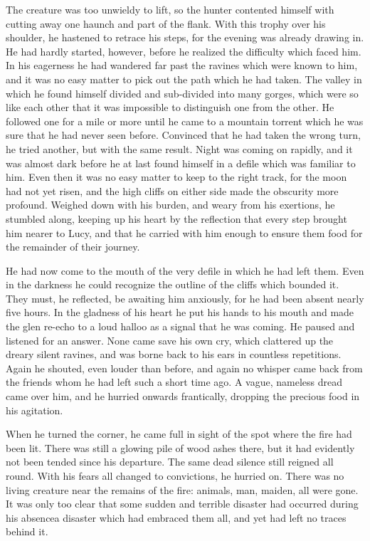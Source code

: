 \documentclass[12pt,english]{book}
\begin{document}
The creature was too unwieldy to lift, so the hunter contented himself
with cutting away one haunch and part of the flank. With this trophy
over his shoulder, he hastened to retrace his steps, for the evening
was already drawing in. He had hardly started, however, before he
realized the difficulty which faced him. In his eagerness he had wandered
far past the ravines which were known to him, and it was no easy matter
to pick out the path which he had taken. The valley in which he found
himself divided and sub-divided into many gorges, which were so like
each other that it was impossible to distinguish one from the other.
He followed one for a mile or more until he came to a mountain torrent
which he was sure that he had never seen before. Convinced that he
had taken the wrong turn, he tried another, but with the same result.
Night was coming on rapidly, and it was almost dark before he at last
found himself in a defile which was familiar to him. Even then it
was no easy matter to keep to the right track, for the moon had not
yet risen, and the high cliffs on either side made the obscurity more
profound. Weighed down with his burden, and weary from his exertions,
he stumbled along, keeping up his heart by the reflection that every
step brought him nearer to Lucy, and that he carried with him enough
to ensure them food for the remainder of their journey.

He had now come to the mouth of the very defile in which he had left
them. Even in the darkness he could recognize the outline of the cliffs
which bounded it. They must, he reflected, be awaiting him anxiously,
for he had been absent nearly five hours. In the gladness of his heart
he put his hands to his mouth and made the glen re-echo to a loud
halloo as a signal that he was coming. He paused and listened for
an answer. None came save his own cry, which clattered up the dreary
silent ravines, and was borne back to his ears in countless repetitions.
Again he shouted, even louder than before, and again no whisper came
back from the friends whom he had left such a short time ago. A vague,
nameless dread came over him, and he hurried onwards frantically,
dropping the precious food in his agitation.

When he turned the corner, he came full in sight of the spot where
the fire had been lit. There was still a glowing pile of wood ashes
there, but it had evidently not been tended since his departure. The
same dead silence still reigned all round. With his fears all changed
to convictions, he hurried on. There was no living creature near the
remains of the fire: animals, man, maiden, all were gone. It was only
too clear that some sudden and terrible disaster had occurred during
his absence\mdsh{---}a disaster which had embraced them all, and
yet had left no traces behind it.
\end{document}
